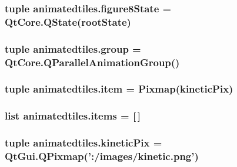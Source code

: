 \subsubsection[{figure8\+State}]{\setlength{\rightskip}{0pt plus 5cm}tuple animatedtiles.\+figure8\+State = Qt\+Core.\+Q\+State({\bf root\+State})}\label{namespaceanimatedtiles_a9b166216b863ae0be32c5d7da097fa14}
\hypertarget{namespaceanimatedtiles_ac070b7f01ffa35fb7e31e66969a7b187}{}
\subsubsection[{group}]{\setlength{\rightskip}{0pt plus 5cm}tuple animatedtiles.\+group = Qt\+Core.\+Q\+Parallel\+Animation\+Group()}\label{namespaceanimatedtiles_ac070b7f01ffa35fb7e31e66969a7b187}
\hypertarget{namespaceanimatedtiles_ac9261de1a75e3315cb038f63544756d0}{}
\subsubsection[{item}]{\setlength{\rightskip}{0pt plus 5cm}tuple animatedtiles.\+item = {\bf Pixmap}({\bf kinetic\+Pix})}\label{namespaceanimatedtiles_ac9261de1a75e3315cb038f63544756d0}
\hypertarget{namespaceanimatedtiles_a393cbd8d3e82651595f25a84b1883af5}{}
\subsubsection[{items}]{\setlength{\rightskip}{0pt plus 5cm}list animatedtiles.\+items = \mbox{[}$\,$\mbox{]}}\label{namespaceanimatedtiles_a393cbd8d3e82651595f25a84b1883af5}
\hypertarget{namespaceanimatedtiles_ab2a52301f69dcbb22be5912ba2d32b4f}{}
\subsubsection[{kinetic\+Pix}]{\setlength{\rightskip}{0pt plus 5cm}tuple animatedtiles.\+kinetic\+Pix = Qt\+Gui.\+Q\+Pixmap('\+:/images/kinetic.\+png')}\label{namespaceanimatedtiles_ab2a52301f69dcbb22be5912ba2d32b4f}
\hypertarget{namespaceanimatedtiles_ac89ca6d7bc45ebf366615df1e4cc7540}{}
